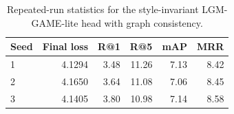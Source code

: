 \begin{table}[!t]
\centering
\footnotesize
\caption{Repeated-run statistics for the style-invariant LGM-GAME-lite head with graph consistency.}
\label{tab:publication_repeated}
\begin{tabular}{lrrrrr}
\toprule
Seed & Final loss & R@1 & R@5 & mAP & MRR \\
\midrule
1 & 4.1294 & 3.48 & 11.26 & 7.13 & 8.42 \\
2 & 4.1650 & 3.64 & 11.08 & 7.06 & 8.45 \\
3 & 4.1405 & 3.80 & 10.98 & 7.14 & 8.58 \\
\bottomrule
\end{tabular}
\end{table}
